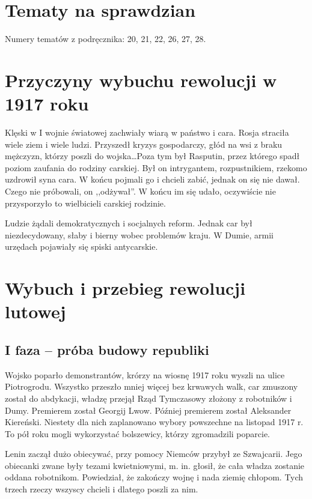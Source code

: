 \documentclass [a4paper, 11pt, oneside]{book}
\begin{document}
    \section{Tematy na sprawdzian} %
    \label{sec:tematy_na_sprawdzian}
        Numery tematów z podręcznika: 20, 21, 22, 26, 27, 28.
    \section{Przyczyny wybuchu rewolucji w 1917 roku} %
    \label{sec:przyczyny_wybuchu_rewolucji_w_1917_roku}
        Klęski w I wojnie światowej zachwiały wiarą w państwo i cara. Rosja straciła wiele ziem i wiele ludzi. Przyszedł kryzys gospodarczy, głód na wsi z braku mężczyzn, którzy poszli do wojska\dots Poza tym był Rasputin, przez którego spadł poziom zaufania do rodziny carskiej. Był on intrygantem, rozpustnikiem, rzekomo uzdrowił syna cara. W końcu pojmali go i chcieli zabić, jednak on się nie dawał. Czego nie próbowali, on ,,odżywał''. W końcu im się udało, oczywiście nie przysporzyło to wielbicieli carskiej rodzinie.

        Ludzie żądali demokratycznych i socjalnych reform. Jednak car był niezdecydowany, słaby i bierny wobec problemów kraju. W Dumie, armii urzędach pojawiały się spiski antycarskie.
    \section{Wybuch i przebieg rewolucji lutowej} %
    \label{sec:wybuch_i_przebieg_rewolucji_lutowej}
        \subsection{I faza -- próba budowy republiki} %
        \label{sub:i_faza_pr_ba_budowy_republiki}
            Wojsko poparło demonstrantów, krórzy na wiosnę 1917 roku wyszli na ulice Piotrogrodu. Wszystko przeszło mniej więcej bez krwawych walk, car zmuszony został do abdykacji, władzę przejął Rząd Tymczasowy złożony z robotników i Dumy. Premierem został Georgij Lwow. Później premierem został Aleksander Kiereński. Niestety dla nich zaplanowano wybory powszechne na listopad 1917 r. To pół roku mogli wykorzystać bolszewicy, którzy zgromadzili poparcie.

            Lenin zaczął dużo obiecywać, przy pomocy Niemców przybył ze Szwajcarii. Jego obiecanki zwane były tezami kwietniowymi, m. in. głosił, że cała władza zostanie oddana robotnikom. Powiedział, że zakończy wojnę i nada ziemię chłopom. Tych trzech rzeczy wszyscy chcieli i dlatego poszli za nim.
\end{document}
